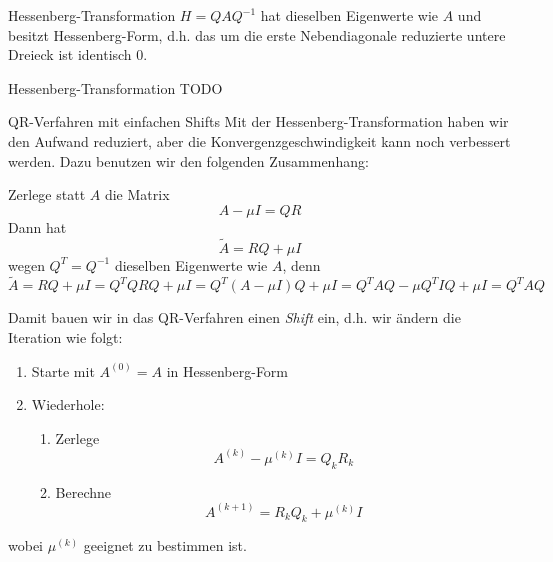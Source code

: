 \begin{defi}{Hessenberg-Transformation}
    $H = Q A Q^{-1}$ hat dieselben Eigenwerte wie $A$ und besitzt Hessenberg-Form, d.h. das um die erste Nebendiagonale reduzierte untere Dreieck ist identisch $0$.
\end{defi}

\begin{example}{Hessenberg-Transformation}
    TODO
\end{example}

\begin{bonus}{QR-Verfahren mit einfachen Shifts}
    Mit der Hessenberg-Transformation haben wir den Aufwand reduziert, aber die Konvergenzgeschwindigkeit kann noch verbessert werden.
    Dazu benutzen wir den folgenden Zusammenhang:

    Zerlege statt $A$ die Matrix
    \[
        A - \mu I = QR
    \]
    Dann hat
    \[
        \tilde{A} = RQ + \mu I
    \]
    wegen $Q^T = Q^{-1}$ dieselben Eigenwerte wie $A$, denn
    \[
        \tilde{A} = RQ + \mu I = Q^T Q R Q + \mu I = Q^T (A - \mu I) Q + \mu I = Q^T A Q - \mu Q^T I Q + \mu I =  Q^T A Q
    \]

    Damit bauen wir in das QR-Verfahren einen \emph{Shift} ein, d.h. wir ändern die Iteration wie folgt:
    \begin{enumerate}
        \item Starte mit $A^{(0)} = A$ in Hessenberg-Form
        \item Wiederhole:
              \begin{enumerate}
                  \item Zerlege
                        \[
                            A^{(k)} - \mu^{(k)} I = Q_k R_k
                        \]
                  \item Berechne
                        \[
                            A^{(k+1)} = R_k Q_k + \mu^{(k)} I
                        \]
              \end{enumerate}
    \end{enumerate}
    wobei $\mu^{(k)}$ geeignet zu bestimmen ist.


\end{bonus}
